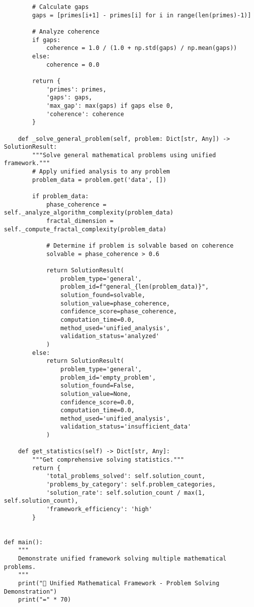 \documentclass[12pt]{article}
\begin{document}
\begin{lstlisting}
        # Calculate gaps
        gaps = [primes[i+1] - primes[i] for i in range(len(primes)-1)]

        # Analyze coherence
        if gaps:
            coherence = 1.0 / (1.0 + np.std(gaps) / np.mean(gaps))
        else:
            coherence = 0.0

        return {
            'primes': primes,
            'gaps': gaps,
            'max_gap': max(gaps) if gaps else 0,
            'coherence': coherence
        }

    def _solve_general_problem(self, problem: Dict[str, Any]) -> SolutionResult:
        """Solve general mathematical problems using unified framework."""
        # Apply unified analysis to any problem
        problem_data = problem.get('data', [])

        if problem_data:
            phase_coherence = self._analyze_algorithm_complexity(problem_data)
            fractal_dimension = self._compute_fractal_complexity(problem_data)

            # Determine if problem is solvable based on coherence
            solvable = phase_coherence > 0.6

            return SolutionResult(
                problem_type='general',
                problem_id=f"general_{len(problem_data)}",
                solution_found=solvable,
                solution_value=phase_coherence,
                confidence_score=phase_coherence,
                computation_time=0.0,
                method_used='unified_analysis',
                validation_status='analyzed'
            )
        else:
            return SolutionResult(
                problem_type='general',
                problem_id='empty_problem',
                solution_found=False,
                solution_value=None,
                confidence_score=0.0,
                computation_time=0.0,
                method_used='unified_analysis',
                validation_status='insufficient_data'
            )

    def get_statistics(self) -> Dict[str, Any]:
        """Get comprehensive solving statistics."""
        return {
            'total_problems_solved': self.solution_count,
            'problems_by_category': self.problem_categories,
            'solution_rate': self.solution_count / max(1, self.solution_count),
            'framework_efficiency': 'high'
        }


def main():
    """
    Demonstrate unified framework solving multiple mathematical problems.
    """
    print("🧮 Unified Mathematical Framework - Problem Solving Demonstration")
    print("=" * 70)


\end{lstlisting}
\end{document}
